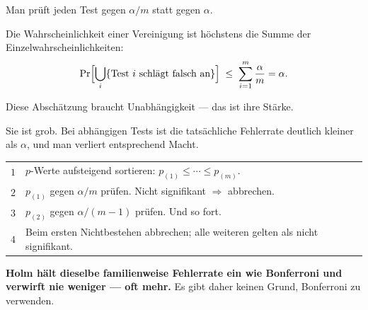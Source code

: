 \begin{merksatz}
Man prüft jeden Test gegen $\alpha/m$ statt gegen $\alpha$.

Die Wahrscheinlichkeit einer Vereinigung ist höchstens die Summe der Einzelwahrscheinlichkeiten:
\[ \Pr\Bigl[\bigcup_{i} \{\text{Test } i \text{ schlägt falsch an}\}\Bigr] \;\le\; \sum_{i=1}^m \frac{\alpha}{m} = \alpha . \]

Diese Abschätzung braucht  Unabhängigkeit --- das ist ihre Stärke.

Sie ist grob. Bei abhängigen Tests ist die tatsächliche Fehlerrate deutlich kleiner als $\alpha$, und man verliert entsprechend Macht.
\end{merksatz}

\begin{merksatz}
\begin{center}
\renewcommand{\arraystretch}{1.5}
\begin{tabular}{@{}P{1.0cm}P{7.4cm}@{}}
\toprule
$1$ & $p$-Werte aufsteigend sortieren: $p_{(1)} \le \cdots \le p_{(m)}$.\\
$2$ & $p_{(1)}$ gegen $\alpha/m$ prüfen. Nicht signifikant $\Rightarrow$ abbrechen.\\
$3$ & $p_{(2)}$ gegen $\alpha/(m-1)$ prüfen. Und so fort.\\
$4$ & Beim ersten Nichtbestehen abbrechen; alle weiteren gelten als nicht signifikant.\\
\bottomrule
\end{tabular}
\end{center}

\begin{center}
\begin{minipage}{0.9\textwidth}
\textbf{Holm hält dieselbe familienweise Fehlerrate ein wie Bonferroni und verwirft nie weniger --- oft mehr.} Es gibt daher keinen Grund, Bonferroni zu verwenden.
\end{minipage}
\end{center}

\begin{center}
\begin{minipage}{0.88\textwidth}
\end{minipage}
\end{center}
\end{merksatz}

